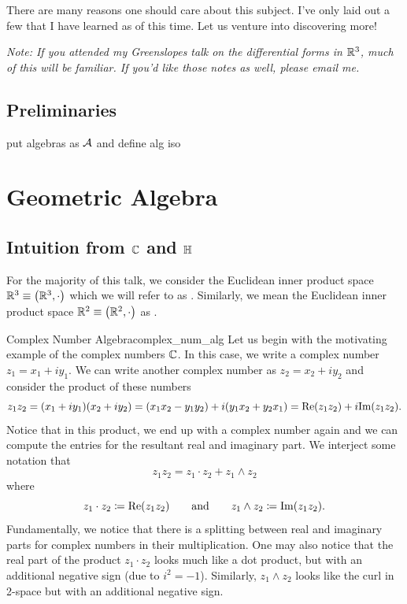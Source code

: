 There are many reasons one should care about this subject.  I've only laid out a few that I have learned as of this time.  Let us venture into discovering more!

\emph{Note: If you attended my Greenslopes talk on the differential forms in $\mathbb{R}^3$, much of this will be familiar. If you'd like those notes as well, please email me.}

\subsection{Preliminaries}
put algebras as $\mathcal{A}$ and define alg iso

\section{Geometric Algebra}
\subsection{Intuition from $\mathbb{C}$ and $\mathbb{H}$}
For the majority of this talk, we consider the Euclidean inner product space $\mathbb{R}^3\equiv \left(\mathbb{R}^3,\cdot\right)$ which we will refer to as .  Similarly, we mean the Euclidean inner product space $\mathbb{R}^2\equiv \left( \mathbb{R}^2, \cdot\right)$ as . 

\begin{ex}{Complex Number Algebra}{complex_num_alg}
Let us begin with the motivating example of the complex numbers $\mathbb{C}$.  In this case, we write a complex number $z_1=x_1+iy_1$.  We can write another complex number as $z_2=x_2+iy_2$ and consider the product of these numbers
\[
z_1z_2 = (x_1+iy_1)(x_2+iy_2)= (x_1x_2 - y_1y_2)+i(y_1x_2+y_2x_1) = \mathrm{Re}(z_1z_2)+i\mathrm{Im}(z_1z_2).
\]
Notice that in this product, we end up with a complex number again and we can compute the entries for the resultant real and imaginary part.  We interject some notation that
\[
z_1z_2 = z_1\cdot z_2 + z_1 \wedge z_2
\]
where
\[
z_1 \cdot z_2 \coloneqq \mathrm{Re}(z_1z_2) \qquad \textrm{and} \qquad z_1 \wedge z_2 \coloneqq \mathrm{Im}(z_1z_2).
\]
Fundamentally, we notice that there is a splitting between real and imaginary parts for complex numbers in their multiplication.  One may also notice that the real part of the product $z_1\cdot z_2$ looks much like a dot product, but with an additional negative sign (due to $i^2=-1$). Similarly, $z_1\wedge z_2$ looks like the curl in 2-space but with an additional negative sign.
\end{ex}

